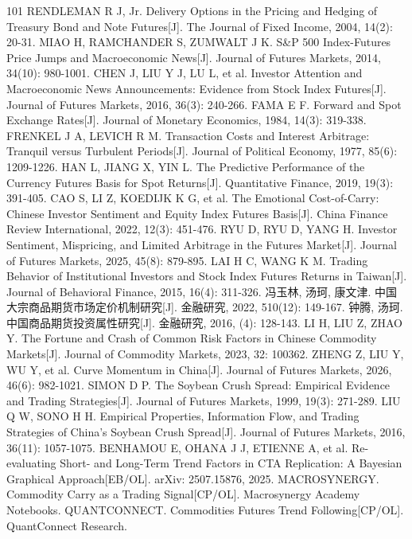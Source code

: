 \documentclass[12pt,a4paper]{ctexart}
\begin{document}
\begin{thebibliography}{101}
 RENDLEMAN R J, Jr. Delivery Options in the Pricing and Hedging of Treasury Bond and Note Futures[J]. The Journal of Fixed Income, 2004, 14(2): 20-31.
 MIAO H, RAMCHANDER S, ZUMWALT J K. S\&P 500 Index-Futures Price Jumps and Macroeconomic News[J]. Journal of Futures Markets, 2014, 34(10): 980-1001.
 CHEN J, LIU Y J, LU L, et al. Investor Attention and Macroeconomic News Announcements: Evidence from Stock Index Futures[J]. Journal of Futures Markets, 2016, 36(3): 240-266.
 FAMA E F. Forward and Spot Exchange Rates[J]. Journal of Monetary Economics, 1984, 14(3): 319-338.
 FRENKEL J A, LEVICH R M. Transaction Costs and Interest Arbitrage: Tranquil versus Turbulent Periods[J]. Journal of Political Economy, 1977, 85(6): 1209-1226.
 HAN L, JIANG X, YIN L. The Predictive Performance of the Currency Futures Basis for Spot Returns[J]. Quantitative Finance, 2019, 19(3): 391-405.
 CAO S, LI Z, KOEDIJK K G, et al. The Emotional Cost-of-Carry: Chinese Investor Sentiment and Equity Index Futures Basis[J]. China Finance Review International, 2022, 12(3): 451-476.
 RYU D, RYU D, YANG H. Investor Sentiment, Mispricing, and Limited Arbitrage in the Futures Market[J]. Journal of Futures Markets, 2025, 45(8): 879-895.
 LAI H C, WANG K M. Trading Behavior of Institutional Investors and Stock Index Futures Returns in Taiwan[J]. Journal of Behavioral Finance, 2015, 16(4): 311-326.
 冯玉林, 汤珂, 康文津. 中国大宗商品期货市场定价机制研究[J]. 金融研究, 2022, 510(12): 149-167.
 钟腾, 汤珂. 中国商品期货投资属性研究[J]. 金融研究, 2016, (4): 128-143.
 LI H, LIU Z, ZHAO Y. The Fortune and Crash of Common Risk Factors in Chinese Commodity Markets[J]. Journal of Commodity Markets, 2023, 32: 100362.
 ZHENG Z, LIU Y, WU Y, et al. Curve Momentum in China[J]. Journal of Futures Markets, 2026, 46(6): 982-1021.
 SIMON D P. The Soybean Crush Spread: Empirical Evidence and Trading Strategies[J]. Journal of Futures Markets, 1999, 19(3): 271-289.
 LIU Q W, SONO H H. Empirical Properties, Information Flow, and Trading Strategies of China's Soybean Crush Spread[J]. Journal of Futures Markets, 2016, 36(11): 1057-1075.
 BENHAMOU E, OHANA J J, ETIENNE A, et al. Re-evaluating Short- and Long-Term Trend Factors in CTA Replication: A Bayesian Graphical Approach[EB/OL]. arXiv: 2507.15876, 2025.
 MACROSYNERGY. Commodity Carry as a Trading Signal[CP/OL]. Macrosynergy Academy Notebooks.
 QUANTCONNECT. Commodities Futures Trend Following[CP/OL]. QuantConnect Research.

\end{thebibliography}
\end{document}
